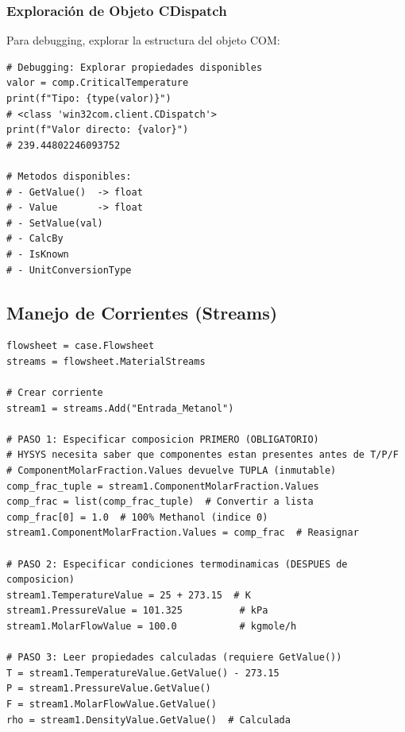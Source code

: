 \documentclass[12pt,a4paper]{article}
\begin{document}
\subsubsection{Exploración de Objeto CDispatch}

Para debugging, explorar la estructura del objeto COM:

\begin{lstlisting}
# Debugging: Explorar propiedades disponibles
valor = comp.CriticalTemperature
print(f"Tipo: {type(valor)}")
# <class 'win32com.client.CDispatch'>
print(f"Valor directo: {valor}")
# 239.44802246093752

# Metodos disponibles:
# - GetValue()  -> float
# - Value       -> float
# - SetValue(val)
# - CalcBy
# - IsKnown
# - UnitConversionType
\end{lstlisting}

\subsection{Manejo de Corrientes (Streams)}

\begin{lstlisting}
flowsheet = case.Flowsheet
streams = flowsheet.MaterialStreams

# Crear corriente
stream1 = streams.Add("Entrada_Metanol")

# PASO 1: Especificar composicion PRIMERO (OBLIGATORIO)
# HYSYS necesita saber que componentes estan presentes antes de T/P/F
# ComponentMolarFraction.Values devuelve TUPLA (inmutable)
comp_frac_tuple = stream1.ComponentMolarFraction.Values
comp_frac = list(comp_frac_tuple)  # Convertir a lista
comp_frac[0] = 1.0  # 100% Methanol (indice 0)
stream1.ComponentMolarFraction.Values = comp_frac  # Reasignar

# PASO 2: Especificar condiciones termodinamicas (DESPUES de composicion)
stream1.TemperatureValue = 25 + 273.15  # K
stream1.PressureValue = 101.325          # kPa
stream1.MolarFlowValue = 100.0           # kgmole/h

# PASO 3: Leer propiedades calculadas (requiere GetValue())
T = stream1.TemperatureValue.GetValue() - 273.15
P = stream1.PressureValue.GetValue()
F = stream1.MolarFlowValue.GetValue()
rho = stream1.DensityValue.GetValue()  # Calculada
\end{lstlisting}
\end{document}
